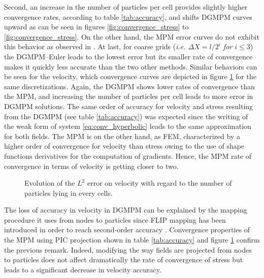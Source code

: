Second, an increase in the number of particles per cell provides slightly higher convergence rates, according to table \ref{tab:accuracy}, and shifts DGMPM curves upward as can be seen in figures \ref{fig:convergence_stress} to \ref{fig:convergence_stress}. On the other hand, the MPM error curves do not exhibit this behavior as observed in \cite{MPM_BSpline1}. At last, for coarse grids (\textit{i.e. $\Delta X= l/2^i$ for $i \leq 3$}) the DGMPM--Euler leads to the lowest error but its smaller rate of convergence makes it quickly less accurate than the two other methods. Similar behaviors can be seen for the velocity, which convergence curves are depicted in figure \ref{fig:convergence_velocity} for the same discretizations. Again, the DGMPM shows lower rates of convergence than the MPM, and increasing the number of particles per cell leads to more error in DGMPM solutions. The same order of accuracy for velocity and stress resulting from the DGMPM (see table \ref{tab:accuracy}) was expected since the writing of the weak form of system \eqref{eq:conv_hyperbolic} leads to the same approximation for both fields. The MPM is on the other hand, as FEM, characterized by a higher order of convergence for velocity than stress owing to the use of shape functions derivatives for the computation of gradients. Hence, the MPM rate of convergence in terms of velocity is getting closer to two. 

\begin{figure}[h!]
  \centering
  {\label{subfig:convV_2ppc}}
  {\label{subfig:convV_6ppc}}
  {\label{subfig:convV_10ppc}}
  {\label{subfig:convV_20ppc}}
  \caption{Evolution of the $L^2$ error on velocity with regard to the number of particles lying in every cells.}
  \label{fig:convergence_velocity}
\end{figure}
The loss of accuracy in velocity in DGMPM can be explained by the mapping procedure it uses from nodes to particles since FLIP mapping has been introduced in order to reach second-order accuracy \cite{PIC_Nishiguchi}.
Convergence properties of the MPM using PIC projection shown in table \ref{tab:accuracy} and figure \ref{fig:convergence_velocity} confirm the previous remark. Indeed, modifying the way fields are projected from nodes to particles does not affect dramatically the rate of convergence of stress but leads to a significant decrease in velocity accuracy.

